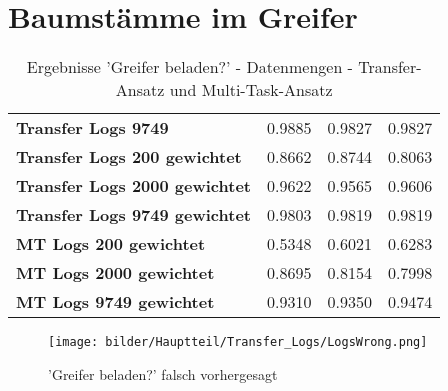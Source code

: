 \chapter{Baumstämme im Greifer}
\label{appendix:BaumstammImGreifer}

	
	\begin{table}[ht]
	\centering
	\begin{tabularx}{\textwidth}{llll}
	\rowcolor{Gray}	\textbf{Transfer Logs 9749} 			& 0.9885 & 0.9827 & 0.9827	\\ 
		\textbf{Transfer Logs 200 gewichtet}	& 0.8662 & 0.8744 & 0.8063 	\\		
		\textbf{Transfer Logs 2000 gewichtet}	& 0.9622 & 0.9565 & 0.9606  \\	
		\textbf{Transfer Logs 9749 gewichtet}	& 0.9803 & 0.9819 & 0.9819	\\	
		\textbf{MT Logs 200 gewichtet}	 	    & 0.5348 & 0.6021 & 0.6283 	\\		
		\textbf{MT Logs 2000 gewichtet}	 	    & 0.8695 & 0.8154 & 0.7998 	\\	
		\textbf{MT Logs 9749 gewichtet}	 	    & 0.9310 & 0.9350 & 0.9474  \\	
	\end{tabularx}
	\caption{Ergebnisse 'Greifer beladen?' - Datenmengen - Transfer-Ansatz und Multi-Task-Ansatz}
	\label{table:Ergebnisse_Transfer_Logs}
\end{table}


	\begin{figure}[h]
	\centering
	\texttt{[image: bilder/Hauptteil/Transfer\_Logs/LogsWrong.png]}
	\caption{'Greifer beladen?' falsch vorhergesagt}
	\label{img:LogsFalschVorhergesagt}
	\end{figure}